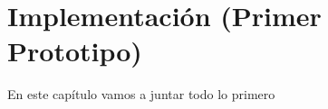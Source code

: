\chapter{Implementación (Primer Prototipo)}\label{ch:Implementación}
En este capítulo vamos a juntar todo lo primero